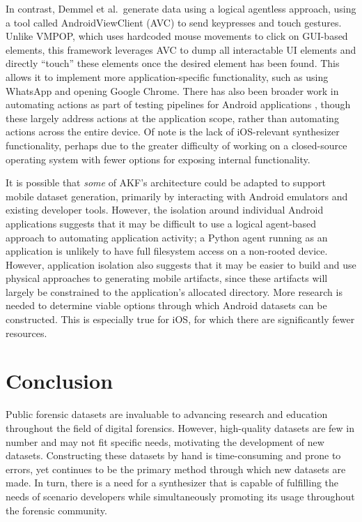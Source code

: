 \documentclass[letterpaper,12pt]{report}
\begin{document}
In contrast, Demmel et al.~generate data using a logical agentless
approach, using a tool called AndroidViewClient (AVC) to send keypresses
and touch gestures. Unlike VMPOP, which uses hardcoded mouse movements
to click on GUI-based elements, this framework leverages AVC to dump all
interactable UI elements and directly ``touch'' these elements once the
desired element has been found. This allows it to implement more
application-specific functionality, such as using WhatsApp and opening
Google Chrome. There has also been broader work in automating actions as
part of testing pipelines for Android applications
\cite{janickiObstaclesOpportunitiesDeploying2012,nagowahNovelApproachAutomation2012,linares-vasquezHowDevelopersTest2017},
though these largely address actions at the application scope, rather
than automating actions across the entire device. Of note is the lack of
iOS-relevant synthesizer functionality, perhaps due to the greater
difficulty of working on a closed-source operating system with fewer
options for exposing internal functionality.

It is possible that \emph{some} of AKF's architecture could be adapted
to support mobile dataset generation, primarily by interacting with
Android emulators and existing developer tools. However, the isolation
around individual Android applications suggests that it may be difficult
to use a logical agent-based approach to automating application
activity; a Python agent running as an application is unlikely to have
full filesystem access on a non-rooted device. However, application
isolation also suggests that it may be easier to build and use physical
approaches to generating mobile artifacts, since these artifacts will
largely be constrained to the application's allocated directory. More
research is needed to determine viable options through which Android
datasets can be constructed. This is especially true for iOS, for which
there are significantly fewer resources.

\chapter{Conclusion}\label{chapter-nine}

Public forensic datasets are invaluable to advancing research and
education throughout the field of digital forensics. However,
high-quality datasets are few in number and may not fit specific needs,
motivating the development of new datasets. Constructing these datasets
by hand is time-consuming and prone to errors, yet continues to be the
primary method through which new datasets are made. In turn, there is a
need for a synthesizer that is capable of fulfilling the needs of
scenario developers while simultaneously promoting its usage throughout
the forensic community.
\end{document}
